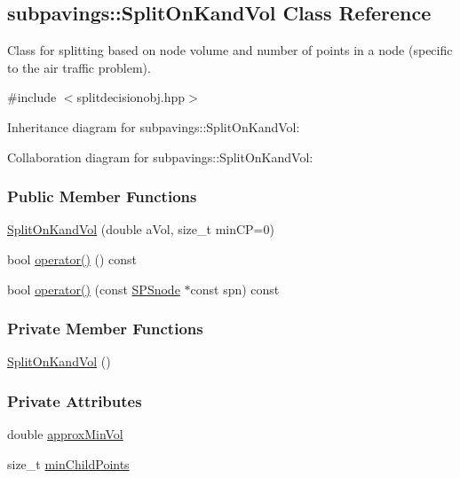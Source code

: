 \hypertarget{classsubpavings_1_1SplitOnKandVol}{\subsection{subpavings\-:\-:\-Split\-On\-Kand\-Vol \-Class \-Reference}
\label{classsubpavings_1_1SplitOnKandVol}
}


\-Class for splitting based on node volume and number of points in a node (specific to the air traffic problem).  




{\ttfamily \#include $<$splitdecisionobj.\-hpp$>$}



\-Inheritance diagram for subpavings\-:\-:\-Split\-On\-Kand\-Vol\-:


\-Collaboration diagram for subpavings\-:\-:\-Split\-On\-Kand\-Vol\-:
\subsubsection*{\-Public \-Member \-Functions}
\begin{DoxyCompactItemize}
\item 
\hyperlink{classsubpavings_1_1SplitOnKandVol_aa54cbe73a244a1c7d73ce9aa975279d0}{\-Split\-On\-Kand\-Vol} (double a\-Vol, size\-\_\-t min\-C\-P=0)
\item 
bool \hyperlink{classsubpavings_1_1SplitOnKandVol_a5995683a3db1e801a10e7e0baf011d03}{operator()} () const 
\item 
bool \hyperlink{classsubpavings_1_1SplitOnKandVol_afc8d8d30b0c25478ffbce3d2358cfd89}{operator()} (const \hyperlink{classsubpavings_1_1SPSnode}{\-S\-P\-Snode} $\ast$const spn) const 
\end{DoxyCompactItemize}
\subsubsection*{\-Private \-Member \-Functions}
\begin{DoxyCompactItemize}
\item 
\hyperlink{classsubpavings_1_1SplitOnKandVol_adbdb11710318e74198eb1ad23a63f56f}{\-Split\-On\-Kand\-Vol} ()
\end{DoxyCompactItemize}
\subsubsection*{\-Private \-Attributes}
\begin{DoxyCompactItemize}
\item 
double \hyperlink{classsubpavings_1_1SplitOnKandVol_af3766a409d0c882d23965ab7f5868c6c}{approx\-Min\-Vol}
\item 
size\-\_\-t \hyperlink{classsubpavings_1_1SplitOnKandVol_af590d181521aea9eacec7465312cb735}{min\-Child\-Points}
\end{DoxyCompactItemize}


